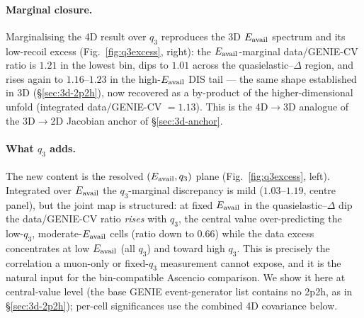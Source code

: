 \paragraph{Marginal closure.} Marginalising the 4D result over $q_{3}$ reproduces
the 3D $E_{\mathrm{avail}}$ spectrum and its low-recoil excess
(Fig.~\ref{fig:q3excess}, right): the $E_{\mathrm{avail}}$-marginal data/GENIE-CV ratio is
$1.21$ in the lowest bin, dips to $1.01$ across the quasielastic--$\Delta$
region, and rises again to $1.16$--$1.23$ in the high-$E_{\mathrm{avail}}$ DIS tail --- the
same shape established in 3D (\S\ref{sec:3d-2p2h}), now recovered as a by-product
of the higher-dimensional unfold (integrated data/GENIE-CV $=1.13$). This is the
4D$\to$3D analogue of the 3D$\to$2D Jacobian anchor of \S\ref{sec:3d-anchor}.

\paragraph{What $q_{3}$ adds.} The new content is the resolved $(E_{\mathrm{avail}},q_{3})$
plane (Fig.~\ref{fig:q3excess}, left). Integrated over $E_{\mathrm{avail}}$ the
$q_{3}$-marginal discrepancy is mild ($1.03$--$1.19$, centre panel), but the
joint map is structured: at fixed $E_{\mathrm{avail}}$ in the quasielastic--$\Delta$ dip the
data/GENIE-CV ratio \emph{rises} with $q_{3}$, the central value over-predicting
the low-$q_{3}$, moderate-$E_{\mathrm{avail}}$ cells (ratio down to $0.66$) while the data
excess concentrates at low $E_{\mathrm{avail}}$ (all $q_{3}$) and toward high $q_{3}$. This
is precisely the correlation a muon-only or fixed-$q_{3}$ measurement cannot
expose, and it is the natural input for the bin-compatible Ascencio comparison.
We show it here at central-value level (the base GENIE event-generator list
contains no 2p2h, as in \S\ref{sec:3d-2p2h}); per-cell significances use the
combined 4D covariance below.

